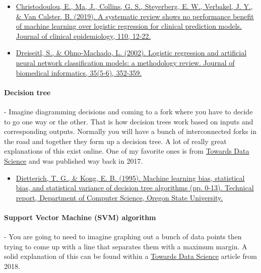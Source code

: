\documentclass{article}
\begin{document}
\begin{itemize}
\item \href{https://www.researchgate.net/profile/Ewout-Steyerberg/publication/331028284_A_systematic_review_shows_no_performance_benefit_of_machine_learning_over_logistic_regression_for_clinical_prediction_models/links/5c66bed192851c1c9de3251b/A-systematic-review-shows-no-performance-benefit-of-machine-learning-over-logistic-regression-for-clinical-prediction-models.pdf}{Christodoulou, E., Ma, J., Collins, G. S., Steyerberg, E. W., Verbakel, J. Y., \& Van Calster, B. (2019). A systematic review shows no performance benefit of machine learning over logistic regression for clinical prediction models. Journal of clinical epidemiology, 110, 12-22.} \cite{christodoulou2019systematic}
\item \href{https://core.ac.uk/download/pdf/82131402.pdf}{Dreiseitl, S., \& Ohno-Machado, L. (2002). Logistic regression and artificial neural network classification models: a methodology review. Journal of biomedical informatics, 35(5-6), 352-359.} \cite{dreiseitl2002logistic}
\end{itemize}
\paragraph{Decision tree} - Imagine diagramming decisions and coming to a fork where you have to decide to go one way or the other. That is how decision trees work based on inputs and corresponding outputs. Normally you will have a bunch of interconnected forks in the road and together they form up a decision tree. A lot of really great explanations of this exist online. One of my favorite ones is from \href{https://towardsdatascience.com/decision-trees-in-machine-learning-641b9c4e8052}{Towards Data Science} and was published way back in 2017.

\begin{itemize}
\item \href{https://citeseerx.ist.psu.edu/viewdoc/download?rep=rep1&type=pdf&doi=10.1.1.38.2702}{Dietterich, T. G., \& Kong, E. B. (1995). Machine learning bias, statistical bias, and statistical variance of decision tree algorithms (pp. 0-13). Technical report, Department of Computer Science, Oregon State University.} \cite{dietterich1995machine}
\end{itemize}
\paragraph{Support Vector Machine (SVM) algorithm} - You are going to need to imagine graphing out a bunch of data points then trying to come up with a line that separates them with a maximum margin. A solid explanation of this can be found within a \href{https://towardsdatascience.com/support-vector-machine-introduction-to-machine-learning-algorithms-934a444fca47 }{Towards Data Science} article from 2018.
\end{document}
